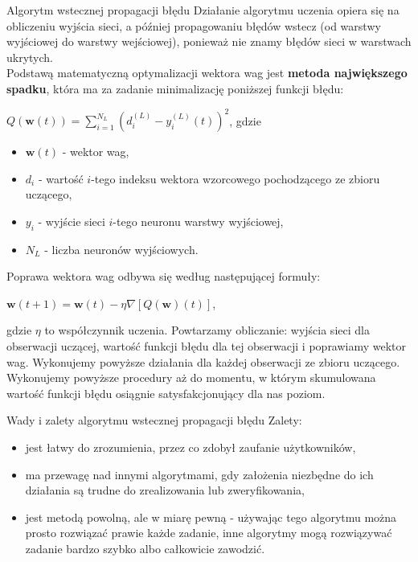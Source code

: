 \documentclass[a4paper,10pt]{beamer}
\begin{document}
		\begin{frame}{Algorytm wstecznej propagacji błędu}
			Działanie algorytmu uczenia opiera się na obliczeniu wyjścia sieci, a później propagowaniu błędów wstecz (od warstwy wyjściowej do warstwy wejściowej), ponieważ nie znamy błędów sieci w warstwach ukrytych.\\
			 Podstawą matematyczną optymalizacji wektora wag jest \textbf{metoda największego spadku}, która ma za zadanie minimalizację poniższej funkcji błędu:
			\begin{center}
				$Q(\mathbf{w}(t))=\sum_{i=1}^{N_{L}}(d_{i}^{(L)}-y_{i}^{(L)}(t))^{2}$, gdzie
			\end{center}
			\begin{itemize}
				\item{$\mathbf{w}(t)$ - wektor wag,}
				\item{$d_i$ - wartość $i$-tego indeksu wektora wzorcowego pochodzącego ze zbioru uczącego,}
				\item{$y_i$ - wyjście sieci $i$-tego neuronu warstwy wyjściowej,}
				\item{$N_L$ - liczba neuronów wyjściowych.}
			\end{itemize}
		\end{frame}
		\begin{frame}
			Poprawa wektora wag odbywa się według następującej formuły:
			\begin{center}
				$\mathbf{w}(t+1)=\mathbf{w}(t)-\eta \nabla [Q(\mathbf{w})(t)]$, 
			\end{center}
			gdzie $\eta$ to współczynnik uczenia. Powtarzamy obliczanie:  wyjścia sieci dla obserwacji uczącej, wartość funkcji błędu dla tej obserwacji i poprawiamy wektor wag. Wykonujemy powyższe działania dla każdej obserwacji ze zbioru uczącego. Wykonujemy powyższe procedury aż do momentu, w którym skumulowana wartość funkcji błędu osiągnie satysfakcjonujący dla nas poziom.
		\end{frame}
		\begin{frame}{Wady i zalety algorytmu wstecznej propagacji błędu}
			Zalety:
			\begin{itemize}
				\item jest łatwy do zrozumienia, przez co zdobył zaufanie użytkowników,
				\item ma przewagę nad innymi algorytmami, gdy założenia niezbędne do ich działania są trudne do zrealizowania lub zweryfikowania,
				\item jest metodą powolną, ale w miarę pewną - używając tego algorytmu można prosto rozwiązać prawie każde zadanie, inne algorytmy mogą rozwiązywać zadanie bardzo szybko albo całkowicie zawodzić. 
			\end{itemize}
		\end{frame}
\end{document}
